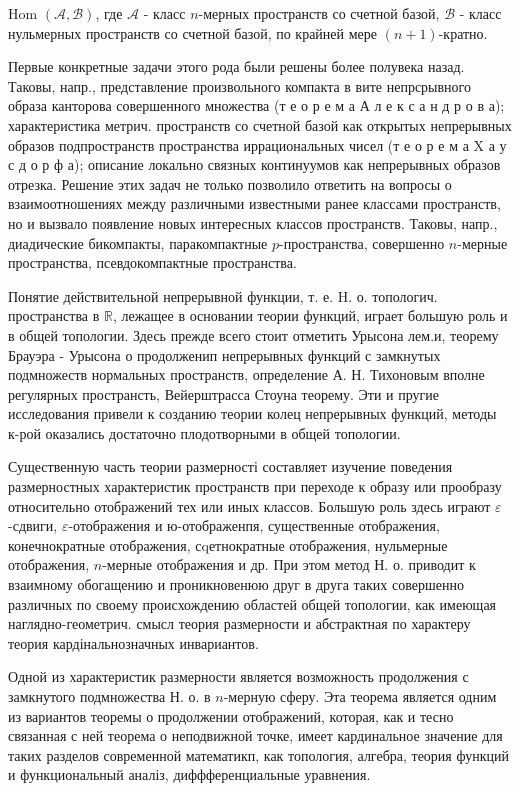\documentclass[10pt]{article}
\begin{document}
Hom $(\mathcal{A}, \mathscr{B})$, где $\mathcal{A}$ - класс $n$-мерных пространств со счетной базой, $\mathscr{B}$ - класс нульмерных пространств со счетной базой, по крайней мере $(n+1)$-кратно.



Первые конкретные задачи этого рода были решены более полувека назад. Таковы, напр., представление произвольного компакта в вите непрсрывного образа канторова совершенного множества (т е о р е м а А л е к с а н д р о в а); характеристика метрич. пространств со счетной базой как открытых непрерывных образов подпространств пространства иррациональных чисел (т е о р е м а X а у с д о р ф а); описание локально связных континуумов как непрерывных образов отрезка. Решение этих задач не только позволило ответить на вопросы о взаимоотношениях между различными известными ранее классами пространств, но и вызвало появление новых интересных классов пространств. Таковы, напр., диадические бикомпакты, паракомпактные $p$-пространства, совершенно $n$-мерные пространства, псевдокомпактные пространства.



Понятие действительной непрерывной функции, т. е. H. о. топологич. пространства в $\mathbb{R}$, лежащее в основании теории функций, играет большую роль и в общей топологии. Здесь прежде всего стоит отметить Урысона лем.и, теорему Брауэра - Урысона о продолженип непрерывных функций с замкнутых подмножеств нормальных пространств, определение А. Н. Тихоновым вполне регулярных пространсть, Вейерштрасса Стоуна теорему. Эти и пругие исследования привели к созданию теории колец непрерывных функций, методы к-рой оказались достаточно плодотворными в общей топологии.



Существенную часть теории размерності составляет изучение поведения размерностных характеристик пространств при переходе к образу или прообразу относительно отображений тех или иных классов. Большую роль здесь играют $\varepsilon$-сдвиги, $\varepsilon$-отображения и ю-отображенпя, существенные отображения, конечнократные отображения, сqетнократные отображения, нульмерные отображения, $n$-мерные отображения и др. При этом метод Н. о. приводит к взаимному обогащению и проникновенюю друг в друга таких совершенно различных по своему происхождению областей общей топологии, как имеющая наглядно-геометрич. смысл теория размерности и абстрактная по характеру теория кардінальнозначных инвариантов.



Одной из характеристик размерности является возможность продолжения с замкнутого подмножества Н. о. в $n$-мерную сферу. Эта теорема является одним из вариантов теоремы о продолжении отображений, которая, как и тесно связанная с ней теорема о неподвижной точке, имеет кардинальное значение для таких разделов современной математикп, как топология, алгебра, теория функций и функциональный аналіз, диффференциальные уравнения.
\end{document}
